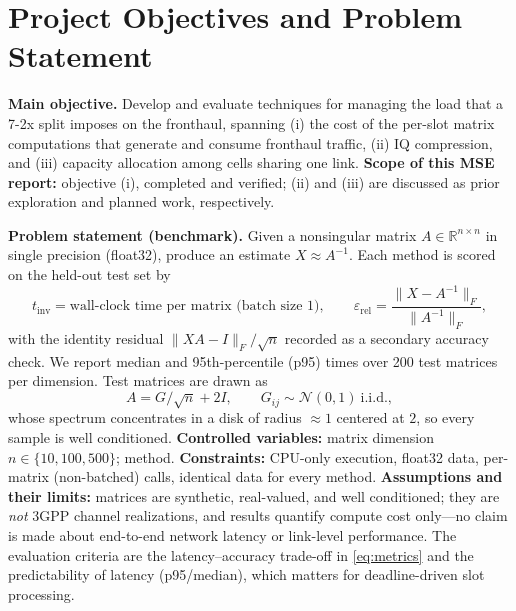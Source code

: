 \documentclass[11pt,a4paper]{article}
\begin{document}
\section{Project Objectives and Problem Statement}

\textbf{Main objective.} Develop and evaluate techniques for managing the
load that a 7-2x split imposes on the fronthaul, spanning (i) the cost of the
per-slot matrix computations that generate and consume fronthaul traffic,
(ii) IQ compression, and (iii) capacity allocation among cells sharing one
link. \textbf{Scope of this MSE report:} objective (i), completed and
verified; (ii) and (iii) are discussed as prior exploration and planned work,
respectively.

\textbf{Problem statement (benchmark).} Given a nonsingular matrix
$A \in \mathbb{R}^{n\times n}$ in single precision (float32), produce an
estimate $X \approx A^{-1}$. Each method is scored on the held-out test set by
\begin{equation}
t_{\mathrm{inv}} = \text{wall-clock time per matrix (batch size 1)}, \qquad
\varepsilon_{\mathrm{rel}} = \frac{\lVert X - A^{-1}\rVert_F}{\lVert A^{-1}\rVert_F},
\label{eq:metrics}
\end{equation}
with the identity residual $\lVert XA - I\rVert_F/\sqrt{n}$ recorded as a
secondary accuracy check. We report median and 95th-percentile (p95) times
over 200 test matrices per dimension. Test matrices are drawn as
\begin{equation}
A = G/\sqrt{n} + 2I, \qquad G_{ij} \sim \mathcal{N}(0,1)\ \text{i.i.d.},
\label{eq:dataset}
\end{equation}
whose spectrum concentrates in a disk of radius ${\approx}1$ centered at $2$,
so every sample is well conditioned. \textbf{Controlled variables:} matrix
dimension $n \in \{10, 100, 500\}$; method. \textbf{Constraints:} CPU-only
execution, float32 data, per-matrix (non-batched) calls, identical data for
every method. \textbf{Assumptions and their limits:} matrices are synthetic,
real-valued, and well conditioned; they are \emph{not} 3GPP channel
realizations, and results quantify compute cost only---no claim is made about
end-to-end network latency or link-level performance. The evaluation criteria
are the latency--accuracy trade-off in \eqref{eq:metrics} and the
predictability of latency (p95/median), which matters for deadline-driven
slot processing.

\end{document}
